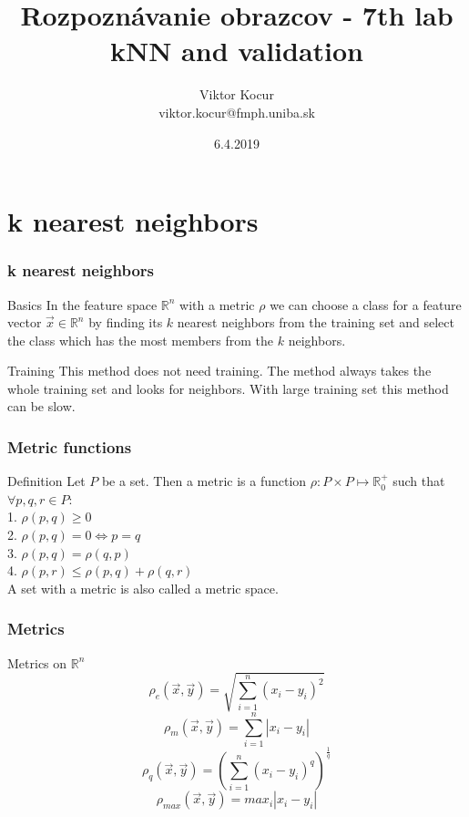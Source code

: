 \documentclass{beamer}
\title[kNN]{Rozpoznávanie obrazcov - 7th lab \\ kNN and validation}
\author[Viktor Kocur]{Viktor Kocur \\{\small viktor.kocur@fmph.uniba.sk}}
\institute{DAI FMFI UK}
\date{6.4.2019}
\begin{document}

\begin{frame}[plain]
  \titlepage  
\end{frame}

\section{k nearest neighbors}

\begin{frame}
\frametitle{k nearest neighbors}
\begin{block}{Basics}
In the feature space $\mathbb{R}^n$ with a metric $\rho$ we can choose a class for a feature vector $\vec{x} \in \mathbb{R}^n$ by finding its $k$ nearest neighbors from the training set and select the class which has the most members from the $k$ neighbors. 
\end{block}

\begin{block}{Training}
This method does not need training. The method always takes the whole training set and looks for neighbors. With large training set this method can be slow.
\end{block}
\end{frame}


\begin{frame}
\frametitle{Metric functions}
\begin{block}{Definition}
Let $P$ be a set. Then a metric is a function $\rho: P \times P \mapsto \mathbb{R}_0^+$ such that $\forall p, q, r \in P$: \\
1. $\rho(p,q) \ge 0$ \\
2. $\rho(p,q) = 0 \Leftrightarrow p = q$ \\
3. $\rho(p,q) = \rho(q,p)$ \\
4. $\rho(p,r) \leq \rho(p,q) + \rho(q,r)$\\
\vspace{1em}
A set with a metric is also called a metric space.
\end{block}
\end{frame}


\begin{frame}
\frametitle{Metrics}
\begin{block}{Metrics on $\mathbb{R}^n$}
$$\rho_e(\vec{x}, \vec{y}) = \sqrt{\sum_{i = 1}^n (x_i - y_i)^2 }   $$
$$\rho_m(\vec{x}, \vec{y}) = \sum_{i = 1}^n |x_i - y_i |   $$
$$\rho_q(\vec{x}, \vec{y}) = \left( \sum_{i = 1}^n (x_i - y_i)^q  \right)^{\frac{1}{q}} $$
$$\rho_{max}(\vec{x}, \vec{y}) = max_{i} | x_i - y_i |  $$
\end{block}
\end{frame}
\end{document}
